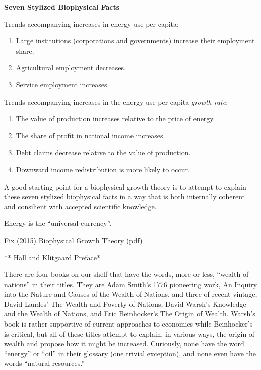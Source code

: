 \documentclass[
]{book}
\begin{document}
\textbf{Seven Stylized Biophysical Facts}

Trends accompanying increases in energy use per capita:

\begin{enumerate}
\def\labelenumi{\arabic{enumi}.}
\item
  Large institutions (corporations and governments) increase their employment
  share.
\item
  Agricultural employment decreases.
\item
  Service employment increases.
\end{enumerate}

Trends accompanying increases in the energy use per capita \emph{growth rate}:

\begin{enumerate}
\def\labelenumi{\arabic{enumi}.}
\item
  The value of production increases relative to the price of energy.
\item
  The share of profit in national income increases.
\item
  Debt claims decrease relative to the value of production.
\item
  Downward income redistribution is more likely to occur.
\end{enumerate}

A good starting point for a biophysical growth theory is to attempt to explain
these seven stylized biophysical facts in a way that is both internally coherent and
consilient with accepted scientific knowledge.

Energy is the ``universal currency''.

\href{PDF/Fix_2015_Biophysical_Growth_Theory.pdf}{Fix (2015) Biophysical Growth Theory (pdf)}

** Hall and Klitgaard Preface*

There are four books on our shelf that have
the words, more or less, ``wealth of nations''
in their titles. They are Adam Smith's 1776
pioneering work, An Inquiry into the
Nature and Causes of the Wealth of Nations,
and three of recent vintage, David Landes'
The Wealth and Poverty of Nations, David
Warsh's Knowledge and the Wealth of
Nations, and Eric Beinhocker's The Origin
of Wealth. Warsh's book is rather supportive
of current approaches to economics
while Beinhocker's is critical, but all of
these titles attempt to explain, in various
ways, the origin of wealth and propose
how it might be increased. Curiously, none
have the word ``energy'' or ``oil'' in their
glossary (one trivial exception), and none
even have the words ``natural resources.''
\end{document}
